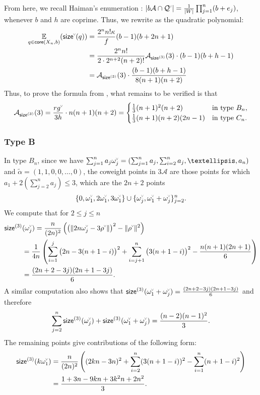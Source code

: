 \documentclass[10pt,a4paper]{amsart}
\newcommand{\chk}[1]{#1^{\normalfont\smash{\scalebox{.5}[.5]{\rotatebox{90}{\textbf{\textless}}}}}}
\newcommand{\Expt}[2]{\operatorname*{\mathbb{E}}\limits_{#1}(#2)}
\newcommand{\Q}{\mathcal{Q}}
\newcommand{\ac}{\mathcal{A}}
\newcommand{\cw}{\chk{\omega}}
\newcommand{\core}{{\sf core}}
\newcommand{\size}{{\sf size}}
\theoremstyle{definition}
\theoremstyle{remark}
\begin{document}
From here, we recall Haiman's enumeration \cite{haiman1994conjectures}:  $|b\ac\cap\chk{\Q}|=\frac{1}{|W|}\prod_{j=1}^n(b+e_j)$, whenever $b$ and $h$ are coprime. Thus, we rewrite  as the quadratic polynomial:
\begin{align*}
\Expt{q \in \core(X_n,b)}{\chk{\size}(q)} &= \frac{2^n n!\kappa}{f}(b-1)(b+2n+1) \\
&= \frac{2^n n!}{2\cdot 2^{n+2}(n+2)!}\ac_{\size^{(3)}}(3)\cdot (b-1)(b+h-1) \\
& = \ac_{\size^{(3)}}(3)\cdot \frac{(b-1)(b+h-1)}{8(n+1)(n+2)}
\end{align*}
Thus, to prove the formula from , what remains to be verified is that
\[
\ac_{\size^{(3)}}(3)=\frac{r\chk{g}}{3h}\cdot n(n+1)(n+2) =
\begin{cases}
\frac{1}{3}(n+1)^2(n+2) & \text{in type } B_n, \\
\frac{1}{3}(n+1)(n+2)(2n-1) & \text{in type } C_n.
\end{cases}
\]


\subsubsection{Type B}
\label{sec:type_b_calc}

In type $B_n$, since we have $\sum_{j=1}^n a_j \cw_j = (\sum_{j=1}^n a_j,\sum_{i=2}^n a_j,\ldots,a_n)$ and $\widetilde{\alpha}=(1,1,0,0,\ldots,0)$, the coweight points in $3\ac$ are those points for which $a_1+2(\sum_{j=2}^n a_j) \leq 3$, which are the $2n+2$ points \[\{0,\cw_1,2\cw_1,3\cw_1\}\cup \{\cw_j,\cw_1+\cw_j\}_{j=2}^n.\]
We compute that for $2 \leq j \leq n$
\begin{align*}\size^{(3)}&(\cw_j) = \frac{n}{(2n)^2}\left( \left(\|2n\cw_j-3\chk{\rho}\|\right)^2-\|\chk{\rho}\|^2\right)
\\ &=
\frac{1}{4n} \left( \sum_{i=1}^j \big(2n-3(n+1-i)\big)^2+\sum_{i=j+1}^n \big(3(n+1-i)\big)^2 -\frac{n(n+1)(2n+1)}{6}\right) \\ 
 &= \frac{(2n+2-3 j) (2n+1-3 j)}{6}. 
\end{align*}
A similar computation also shows that $\size^{(3)}(\cw_1+\cw_j) = \frac{(2n+2-3 j) (2n+1-3 j)}{6}$
and therefore 
\[\sum_{j=2}^n \size^{(3)}(\cw_j)+\size^{(3)}(\cw_1+\cw_j) = \frac{(n-2) (n-1)^2}{3}.\]
The remaining points give contributions of the following form: 
\begin{align*}
\size^{(3)}(k\cw_1) &= \frac{n}{(2 n)^2} \left( (2 k n - 3n)^2 + 
     \sum_{i=2}^n (3 (n + 1 - i))^2 - \sum_{i=1}^n (n + 1 - i)^2 \right) \\
    &=\frac{1 + 3 n - 9 k n + 3 k^2 n + 2 n^2}{3}.
\end{align*}
\end{document}
